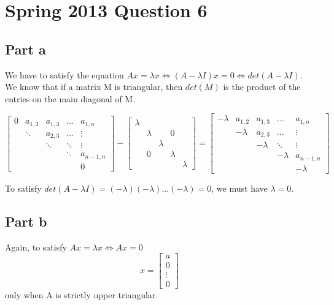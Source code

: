 \documentclass[12pt]{article}
\begin{document}
\section*{Spring 2013 Question 6}

\subsection*{Part a} 
We have to satisfy the equation $Ax=\lambda x \iff (A- \lambda I)x=0 \iff det(A- \lambda I)$.
We know that if a matrix M is triangular, then $det(M)$ is the product of the entries on the main diagonal of M.

\begin{equation}
\begin{bmatrix}
0 & a_{1,2} & a_{1,3} & \dots & a_{1,n} \\
  & \ddots & a_{2,3} & \dots & \vdots \\
  & & \ddots & \ddots & \vdots \\
  & & & \ddots & a_{n-1,n} \\
  & & & & 0
\end{bmatrix}
-
\begin{bmatrix}
\lambda & & & & \\
 & \lambda & & 0 & \\
 & & \lambda & & \\
 & 0 & & \lambda & \\
& & & & \lambda
\end{bmatrix}
=
\begin{bmatrix}
-\lambda & a_{1,2} & a_{1,3} & \dots & a_{1,n} \\
  & -\lambda & a_{2,3} & \dots & \vdots \\
  & & -\lambda & \ddots & \vdots \\
  & & & -\lambda & a_{n-1,n} \\
  & & & & -\lambda
\end{bmatrix}
\end{equation}

To satisfy $det(A- \lambda I) = (-\lambda)(-\lambda)...(-\lambda) = 0$, we must have $\lambda=0$.

\subsection*{Part b}
Again, to satisfy $Ax=\lambda x \iff Ax=0$
\begin{equation*}
x=
\begin{bmatrix}
a \\
0 \\
\vdots \\
0
\end{bmatrix}
\end{equation*}
only when A is strictly upper triangular.
\end{document}
